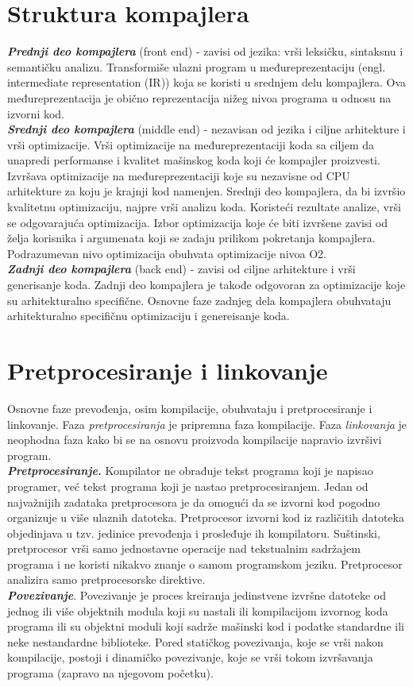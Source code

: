 \documentclass[10pt]{extarticle}
\begin{document}
\section{Struktura kompajlera}
\noindent
\textit{\textbf{Prednji deo kompajlera}} (front end) - zavisi od jezika: vrši leksičku, sintaksnu i semantičku analizu. Transformiše ulazni program u međureprezentaciju (engl. intermediate representation (IR)) koja se koristi
u srednjem delu kompajlera. Ova međureprezentacija je obično reprezentacija nižeg nivoa programa u odnosu na izvorni kod. \\
\textit{\textbf{Srednji deo kompajlera}} (middle end) - nezavisan od jezika i ciljne arhitekture i vrši optimizacije. Vrši optimizacije na
međureprezentaciji koda sa ciljem da unapredi performanse i kvalitet 
mašinskog koda koji će kompajler proizvesti. Izvršava optimizacije na međureprezentaciji koje su nezavisne od CPU arhitekture za koju je krajnji kod namenjen. Srednji deo kompajlera, da bi izvršio kvalitetnu optimizaciju, najpre vrši analizu koda. Koristeći rezultate analize, vrši se odgovarajuća optimizacija. Izbor optimizacija koje će biti izvršene zavisi od želja
korisnika i argumenata koji se zadaju prilikom pokretanja kompajlera. Podrazumevan nivo optimizacija obuhvata optimizacije nivoa O2. \\
\textit{\textbf{Zadnji deo kompajlera}} (back end) - zavisi od ciljne arhitekture i vrši generisanje koda. Zadnji deo kompajlera je takođe odgovoran za optimizacije koje su arhitekturalno specifične. Osnovne faze zadnjeg dela kompajlera obuhvataju arhitekturalno specifičnu optimizaciju i genereisanje koda.

\section{Pretprocesiranje i linkovanje}
\noindent
Osnovne faze prevođenja, osim kompilacije, obuhvataju i pretprocesiranje i linkovanje. Faza \textit{pretprocesiranja} je pripremna faza kompilacije. Faza \textit{linkovanja} je neophodna faza kako bi se na osnovu proizvoda kompilacije napravio izvršivi program. \\
\textit{\textbf{Pretprocesiranje.}} Kompilator ne obrađuje tekst programa koji je napisao programer, već tekst programa koji je nastao pretprocesiranjem.
Jedan od najvažnijih zadataka pretprocesora je da omogući da se izvorni kod pogodno organizuje u više ulaznih datoteka. Pretprocesor izvorni kod iz
različitih datoteka objedinjava u tzv. jedinice prevođenja i prosleđuje ih kompilatoru. Suštinski, pretprocesor vrši samo jednostavne operacije nad tekstualnim sadržajem programa i ne koristi nikakvo znanje
o samom programskom jeziku. Pretprocesor analizira samo pretprocesorske
direktive. \\
\textit{\textbf{Povezivanje}}. Povezivanje je proces kreiranja jedinstvene izvršne datoteke od jednog ili više objektnih modula koji su nastali ili
kompilacijom izvornog koda programa ili su objektni moduli koji
sadrže mašinski kod i podatke standardne ili neke nestandardne biblioteke. Pored statičkog povezivanja, koje se vrši nakon kompilacije, postoji i dinamičko povezivanje, koje se vrši tokom izvršavanja programa (zapravo na njegovom početku). 
\end{document}

